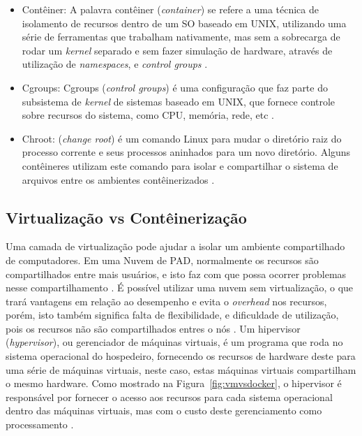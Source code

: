 \documentclass[twoside,english,brazilian]{UNISINOSartigo}
\begin{document}
\begin{itemize}
	\item Contêiner: A palavra contêiner (\textit{container}) se refere a uma técnica de isolamento de recursos dentro de um SO baseado em UNIX, utilizando uma série de ferramentas que trabalham nativamente, mas sem a sobrecarga de rodar um \textit{kernel} separado e sem fazer simulação de hardware, através de utilização de \textit{namespaces}, e \textit{control groups} \cite{LXC2016}.
	\item Cgroups: Cgroups (\textit{control groups}) é uma configuração que faz parte do subsistema de \textit{kernel} de sistemas baseado em UNIX, que fornece controle sobre recursos do sistema, como CPU, memória, rede, etc  \cite{NICKOLOFF2016}.
	\item Chroot: (\textit{change root}) é um comando Linux para mudar o diretório raiz do processo corrente e seus processos aninhados para um novo diretório. Alguns contêineres utilizam este comando para isolar e compartilhar o sistema de arquivos entre os ambientes contêinerizados \cite{Dua2014}. 
\end{itemize}

\subsection{Virtualização vs Contêinerização}
\label{virtualization}
Uma camada de virtualização pode ajudar a isolar um ambiente compartilhado de computadores. Em uma Nuvem de PAD, normalmente os recursos são compartilhados entre mais usuários, e isto faz com que possa ocorrer problemas nesse compartilhamento \cite{Xavier2013}. É possível utilizar uma nuvem sem virtualização, o que trará vantagens em relação ao desempenho e evita o \textit{overhead} nos recursos, porém, isto também significa falta de flexibilidade, e dificuldade de utilização, pois os recursos não são compartilhados entres o nós \cite{Kominos2017}. Um hipervisor (\textit{hypervisor}), ou gerenciador de máquinas virtuais, é um programa que roda no sistema operacional do hospedeiro, fornecendo os recursos de hardware deste para uma série de máquinas virtuais, neste caso, estas máquinas virtuais compartilham o mesmo hardware. Como mostrado na Figura~\ref{fig:vmvsdocker}, o hipervisor é responsável por fornecer o acesso aos recursos para cada sistema operacional dentro das máquinas virtuais, mas com o custo deste gerenciamento como processamento \cite{Zhang2016}. 
\end{document}

